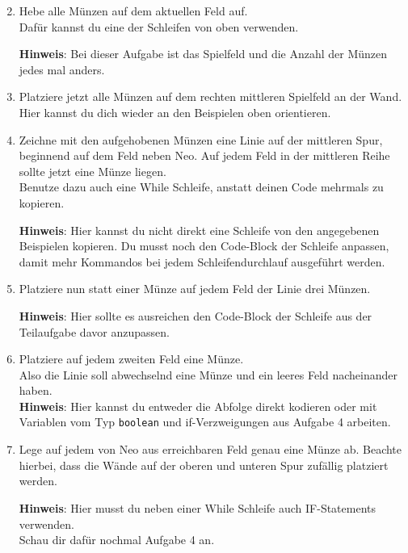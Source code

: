 \begin{enumerate} \setcounter{enumi}{1}
        \item Hebe alle Münzen auf dem aktuellen Feld auf.\\
        Dafür kannst du eine der Schleifen von oben verwenden.

    \textbf{Hinweis}: Bei dieser Aufgabe ist das Spielfeld und die Anzahl der Münzen jedes mal anders.
    \item Platziere jetzt alle Münzen auf dem rechten mittleren Spielfeld an der Wand. 
        Hier kannst du dich wieder an den Beispielen oben orientieren.
        \item Zeichne mit den aufgehobenen Münzen eine Linie auf der mittleren Spur, beginnend auf dem Feld neben Neo.
        Auf jedem Feld in der mittleren Reihe sollte jetzt eine Münze liegen.\\
        Benutze dazu auch eine While Schleife, anstatt deinen Code mehrmals zu kopieren.

    \textbf{Hinweis}: Hier kannst du nicht direkt eine Schleife von den angegebenen Beispielen kopieren.
        Du musst noch den Code-Block der Schleife anpassen, damit mehr Kommandos bei jedem Schleifendurchlauf ausgeführt werden.
    \item Platziere nun statt einer Münze auf jedem Feld der Linie drei Münzen.

    \textbf{Hinweis}: Hier sollte es ausreichen den Code-Block der Schleife aus der Teilaufgabe davor anzupassen.
    \item Platziere auf jedem zweiten Feld eine Münze.\\
        Also die Linie soll abwechselnd eine Münze und ein leeres Feld nacheinander haben.\\
        
        \textbf{Hinweis}: Hier kannst du entweder die Abfolge direkt kodieren oder mit Variablen vom Typ \lstinline{boolean} und if-Verzweigungen aus Aufgabe 4 arbeiten.
    \item \optional Lege auf jedem von Neo aus erreichbaren Feld genau eine Münze ab. 
        Beachte hierbei, dass die Wände auf der oberen und unteren Spur zufällig platziert werden.

    \textbf{Hinweis}: Hier musst du neben einer While Schleife auch IF-Statements verwenden.\\
        Schau dir dafür nochmal Aufgabe 4 an.
\end{enumerate}

